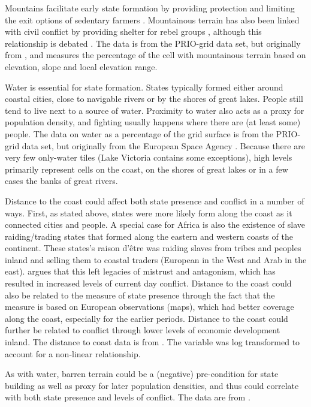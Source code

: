 Mountains facilitate early state formation by providing protection and limiting the
exit options of sedentary farmers \citep{Carneiro1988}. Mountainous terrain has
also been linked with civil conflict by providing shelter for rebel groups
\citep{Hegre2006}, although this relationship is debated \citep{Buhaug2002}. The
data is from the PRIO-grid data set, but originally from \citet{Blyth2002}, and
measures the percentage of the cell with mountainous terrain based on elevation,
slope and local elevation range.

Water is essential for state formation. States typically formed either around
coastal cities, close to navigable rivers or by the shores of great lakes.
People still tend to live next to a source of water. Proximity to water also acts
as a proxy for population density, and fighting usually happens where there are
(at least some) people. The data on water as a percentage of the grid surface is
from the PRIO-grid data set, but originally from the European Space Agency
\citep{Bontemps2009}. Because there are very few only-water tiles (Lake Victoria
contains some exceptions), high levels primarily represent cells on the coast,
on the shores of great lakes or in a few cases the banks of great rivers.

Distance to the coast could affect both state presence and conflict in a number
of ways. First, as stated above, states were more likely form along the coast as
it connected cities and people. A special case for Africa is also the existence
of slave raiding/trading states that formed along the eastern and western coasts
of the continent. These states's raison d'être was raiding slaves from tribes and
peoples inland and selling them to coastal traders (European in the West and
Arab in the east). \citet{Nunn2008} argues that this left legacies of mistrust
and antagonism, which has resulted in increased levels of current day conflict.
Distance to the coast could also be related to the measure of state presence
through the fact that the measure is based on European observations (maps),
which had better coverage along the coast, especially for the earlier periods.
Distance to the coast could further be related to conflict through lower levels
of economic development inland. The distance to coast data is from
\citet{Wessel1996}. The variable was log transformed to account for a non-linear
relationship.

As with water, barren terrain could be a (negative) pre-condition for state
building as well as proxy for later population densities, and thus could
correlate with both state presence and levels of conflict. The data are from
\citet{Bontemps2009}.

